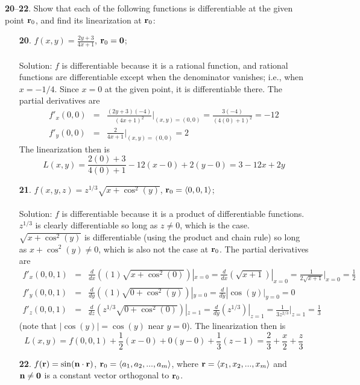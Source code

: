 \documentclass[12pt]{amsbook}
\newcommand{\la}{\langle}
\newcommand{\ra}{\rangle}
\begin{document}
\noindent
{\small {\bf 20}--{\bf 22}}. Show that each of the following functions is differentiable at the
given point ${\bf r}_0$, and find its linearization at ${\bf r}_0$:
\begin{enumerate}
\item[{\small\bf 20}.] $f(x,y)=\frac{2y+3}{4x+1}$, ${\bf r}_0={\bf 0}$;
\\
\\
{\sc Solution}: $f$ is differentiable because it is a rational function, and rational functions are differentiable except when the denominator vanishes; i.e., when $x=-1/4$. Since $x=0$ at the given point, it is differentiable there. The partial derivatives are
\begin{eqnarray*}
f'_x(0,0)&=&\frac{(2y+3)(-4)}{(4x+1)^2}|_{(x,y)=(0,0)}=\frac{3(-4)}{(4(0)+1)^2}=-12 \\
f'_y(0,0)&=&\frac{2}{4x+1}|_{(x,y)=(0,0)}=2
\end{eqnarray*}
The linearization then is
$$L(x,y)=\frac{2(0)+3}{4(0)+1}-12(x-0)+2(y-0)=3-12x+2y$$
\item[{\small\bf 21}.] $f(x,y,z)=z^{1/3}\sqrt{x+\cos^2(y)}$, ${\bf r}_0=\la 0,0,1 \ra$;
\\
\\
{\sc Solution}: $f$ is differentiable because it is a product of differentiable functions. $z^{1/3}$ is clearly differentiable so long as $z\neq 0$, which is the case. $\sqrt{x+\cos^2(y)}$ is differentiable (using the product and chain rule) so long as $x+\cos^2(y) \neq 0$, which is also not the case at ${\bf r}_0$. The partial derivatives are
\begin{eqnarray*}
f'_x(0,0,1)&=&\frac{d}{dx}((1)\sqrt{x+\cos^2(0)})|_{x=0}=\frac{d}{dx}(\sqrt{x+1})|_{x=0}=\frac{1}{2\sqrt{x+1}}|_{x=0}=\frac{1}{2} \\
f'_y(0,0,1)&=&\frac{d}{dy}((1)\sqrt{0+\cos^2(y)})|_{y=0}=\frac{d}{dy}|\cos(y)|_{y=0}=0 \\ 
f'_z(0,0,1)&=&\frac{d}{dz}(z^{1/3}\sqrt{0+\cos^2(0)})|_{z=1}=\frac{d}{dy}(z^{1/3})|_{z=1}=\frac{1}{3z^{2/3}}|_{z=1}=\frac{1}{3}
\end{eqnarray*}
(note that $|\cos(y)|=\cos(y)$ near $y=0$). 
The linearization then is
$$L(x,y)=f(0,0,1)+\frac{1}{2}(x-0)+0(y-0)+\frac{1}{3}(z-1)=\frac{2}{3}+\frac{x}{2}+\frac{z}{3}$$
\item[{\small\bf 22}.] $f({\bf r})=\sin({\bf n}\cdot{\bf r})$, ${\bf r}_0=\la a_1,a_2,...,a_m \ra$, where ${\bf r}=\la x_1,x_2,...,x_m \ra$ and ${\bf n}\neq {\bf 0}$ is a constant vector orthogonal to ${\bf r}_0$.
\\

\end{enumerate}
\end{document}

